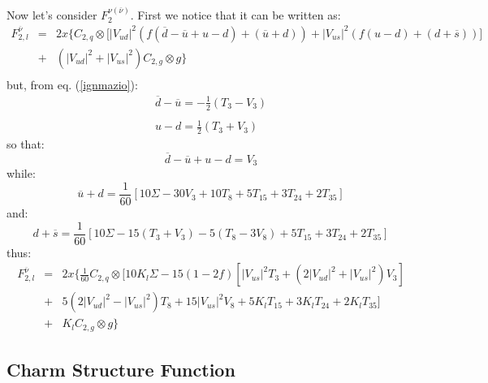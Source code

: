 \documentclass[10pt,a4paper]{article}
\begin{document}
Now let's consider $F_2^{\nu(\overline\nu)}$. First we notice that it
can be written as:
\begin{equation}
\begin{array}{rcl}  
F_{2,l}^{\overline\nu} &=& 2x\Big\{C_{2,q}\otimes\Big[|V_{ud}|^2 \left(f(\overline{d}-\overline{u}+u-d)+(\overline{u}+d)\right) +|V_{us}|^2\left(f(u-d)+(d+\overline{s})\right)\Big]\\
              &+& \left(|V_{ud}|^2+|V_{us}|^2\right)C_{2,g}\otimes g\Big\}\\
\end{array}
\end{equation}
but, from eq. (\ref{ignmazio}):
\begin{equation}
\begin{array}{l}
\displaystyle \overline{d} - \overline{u} = -\frac12(T_3-V_3)\\
\\
\displaystyle u-d = \frac12(T_3+V_3)
\end{array}
\end{equation}
so that:
\begin{equation}
\overline{d}-\overline{u}+u-d = V_3
\end{equation}
while:
\begin{equation}
\overline{u}+d = \frac1{60}[10\Sigma-30V_3+10T_8+5T_{15}+3T_{24}+2T_{35}]
\end{equation}
and:
\begin{equation}
d+\overline{s} = \frac1{60}[10\Sigma-15(T_3+V_3)-5(T_8-3V_8)+5T_{15}+3T_{24}+2T_{35}]
\end{equation}
thus:
\begin{equation}
\begin{array}{rcl}  
F_{2,l}^{\overline\nu} &=& \displaystyle 2x\Bigg\{\frac1{60}C_{2,q}\otimes\Bigg[10K_l\Sigma-15(1-2f)\left[|V_{us}|^2T_3+(2|V_{ud}|^2+|V_{us}|^2)V_3\right]\\
              &+& \displaystyle 5(2|V_{ud}|^2-|V_{us}|^2)T_8+15|V_{us}|^2V_8+5K_lT_{15}+3K_lT_{24}+2K_lT_{35}\Bigg]\\
              &+& K_lC_{2,g}\otimes g\Bigg\}
\end{array}
\end{equation}

\subsection{Charm Structure Function}
\end{document}
